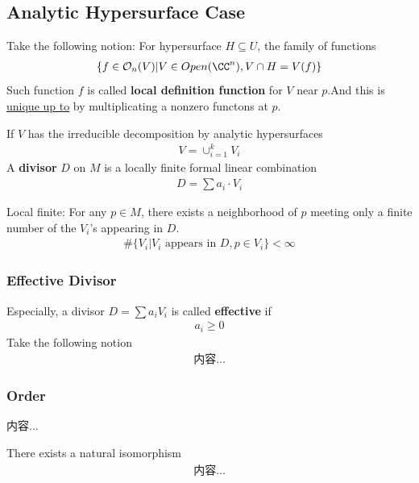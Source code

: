 \documentclass[Total.tex]{subfiles}
\begin{document}
			\subsection{Analytic Hypersurface Case}
				Take the following notion: For hypersurface $H\subseteq U$, the family of functions
				\begin{gather*}
					\{f\in \mathcal{O}_n(V)|V\in Open(\CC^n),V\cap H=V(f)\}
				\end{gather*}
				Such function $f$ is called \textbf{local definition function} for $V$ near $p$.And this is \underline{unique up to} by multiplicating a nonzero functons at $p$.
				\begin{Def}
					If $V$ has the irreducible decomposition by analytic hypersurfaces
					\begin{gather*}
						V=\cup_{i=1}^k V_i
					\end{gather*}
					A \textbf{divisor} $D$ on $M$ is a locally finite formal linear combination 
					\begin{gather*}
						D=\sum a_i\cdot V_i
					\end{gather*}
					
					Local finite: For any $p\in M$, there exists a neighborhood of $p$ meeting only a finite number of the $V_i$'s appearing in $D$.
					\begin{gather*}
						\#\{V_i|V_i\mbox{ appears in }D,p\in V_i\}<\infty
					\end{gather*}
				\end{Def}
				\subsubsection{Effective Divisor}
				\begin{Def}
					Especially, a divisor $D=\sum a_i V_i$ is called \textbf{effective} if
					\begin{gather*}
						a_i\geq 0
					\end{gather*}
					Take the following notion
					\begin{gather*}
						内容...
					\end{gather*}
				\end{Def}
				\subsubsection{Order}
				\begin{Def}
					内容...
				\end{Def}
				\begin{proposition}
					There exists a natural isomorphism
					\begin{gather*}
						内容...
					\end{gather*}
				\end{proposition}
\end{document}
